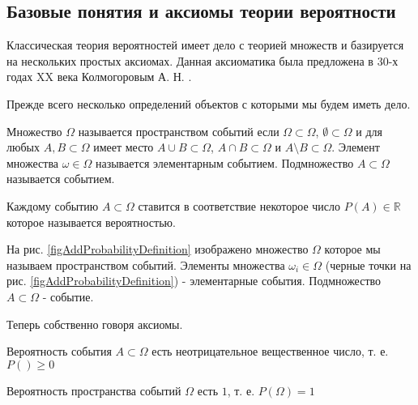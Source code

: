\subsection{Базовые понятия и аксиомы теории вероятности}

Классическая теория вероятностей имеет дело с теорией множеств и
базируется на нескольких простых аксиомах. Данная аксиоматика была
предложена в 30-х годах XX века Колмогоровым
А. Н. \cite{bKolmogorov74basic}. 

Прежде всего несколько определений объектов с которыми мы будем иметь
дело. 

\begin{definition}
  Множество $\Omega$ называется пространством событий если
  $\Omega \subset \Omega$, $\emptyset \subset \Omega$ и для любых
  $A,B \subset \Omega$ имеет место
  $A \cup B \subset \Omega$, $A \cap B \subset \Omega$ и
  $A \setminus B \subset \Omega$.  Элемент множества
  $\omega \in \Omega$ называется элементарным событием. Подмножество 
  $A \subset \Omega$ называется событием.
\end{definition}

\begin{definition}
  Каждому событию $A \subset \Omega$ ставится в соответствие некоторое
  число $P\left(A\right) \in \mathbb{R}$ которое называется вероятностью.
\end{definition}

\begin{example}

На рис. \ref{figAddProbabilityDefinition} изображено множество
$\Omega$ которое мы называем пространством событий. Элементы
множества $\omega_i \in \Omega$ (черные точки на
рис. \ref{figAddProbabilityDefinition}) - элементарные
события. Подмножество $A \subset \Omega$ - событие.
\end{example}

Теперь собственно говоря аксиомы.

\begin{axiom}[Не-отрицательность]
  \label{axProbabilityKolmogorovNonNegativity}
  Вероятность события $A \subset \Omega$ есть неотрицательное
  вещественное число, т. е. $P\left(\right) \ge 0$
\end{axiom}

\begin{axiom}[Нормировка]
  \label{axProbabilityNormalization}
  Вероятность пространства событий $\Omega$ есть $1$, т. е.
  $P\left(\Omega\right) = 1$
\end{axiom}

